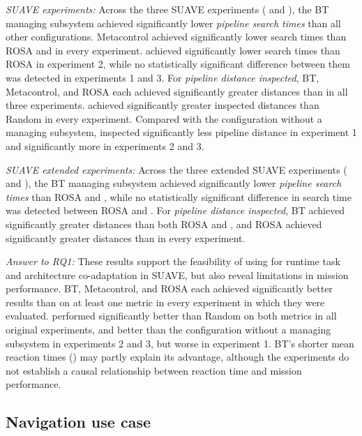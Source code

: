 \emph{SUAVE experiments:} Across the three SUAVE experiments ( and ), the BT managing subsystem achieved significantly lower \emph{pipeline search times} than all other configurations. Metacontrol achieved significantly lower search times than ROSA and \planta in every experiment. \planta achieved significantly lower search times than ROSA in experiment 2, while no statistically significant difference between them was detected in experiments 1 and 3. For \emph{pipeline distance inspected}, BT, Metacontrol, and ROSA each achieved significantly greater distances than \planta in all three experiments. \planta achieved significantly greater inspected distances than Random in every experiment. Compared with the configuration without a managing subsystem, \planta inspected significantly less pipeline distance in experiment 1 and significantly more in experiments 2 and 3. %

\emph{SUAVE extended experiments:} Across the three extended SUAVE experiments ( and ), the BT managing subsystem achieved significantly lower \emph{pipeline search times} than ROSA and \planta, while no statistically significant difference in search time was detected between ROSA and \planta. For \emph{pipeline distance inspected}, BT achieved significantly greater distances than both ROSA and \planta, and ROSA achieved significantly greater distances than \planta in every experiment.

\emph{Answer to RQ1:} These results support the feasibility of using \planta for runtime task and architecture co-adaptation in SUAVE, but also reveal limitations in mission performance. BT, Metacontrol, and ROSA each achieved significantly better results than \planta on at least one metric in every experiment in which they were evaluated. \planta performed significantly better than Random on both metrics in all original experiments, and better than the configuration without a managing subsystem in experiments 2 and 3, but worse in experiment 1. BT's shorter mean reaction times () may partly explain its advantage, although the experiments do not establish a causal relationship between reaction time and mission performance. %

\subsection{Navigation use case}\label{planta:sec:nav_exp}
